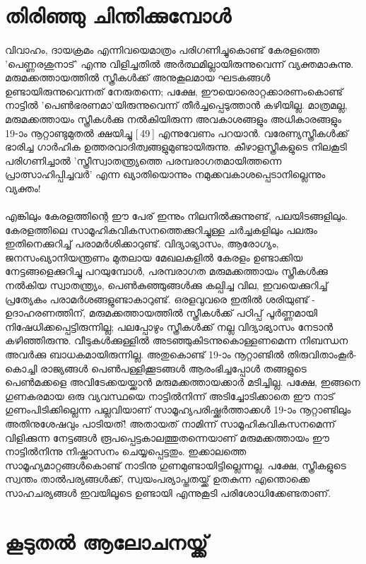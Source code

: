 \section{തിരിഞ്ഞു ചിന്തിക്കുമ്പോൾ}
\paragraph{}വിവാഹം, ദായക്രമം എന്നിവയെമാത്രം പരിഗണിച്ചുകൊണ്ട് കേരളത്തെ 'പെണ്ണരശുനാട്' എന്നു വിളിച്ചതിൽ അർത്ഥമില്ലായിരുന്നുവെന്ന് വ്യക്തമാകുന്നു. മരുമക്കത്തായത്തിൽ സ്ത്രീകൾക്ക് അനുകൂലമായ ഘടകങ്ങൾ ഉണ്ടായിരുന്നുവെന്നത് നേരുതന്നെ; പക്ഷേ, ഈയൊരൊറ്റക്കാരണംകൊണ്ട് നാട്ടിൽ 'പെൺഭരണമാ'യിരുന്നുവെന്ന് തീർച്ചപ്പെടുത്താൻ കഴിയില്ല. മാത്രമല്ല, മരുമക്കത്തായം സ്ത്രീകൾക്കു നൽകിയിരുന്ന അവകാശങ്ങളും അധികാരങ്ങളും 19-ാം നൂറ്റാണ്ടുമുതൽ ക്ഷയിച്ചു [ 49 ] എന്നുവേണം പറയാൻ. വരേണ്യസ്ത്രീകൾക്ക് ഭാരിച്ച ഗാർഹിക ഉത്തരവാദിത്വങ്ങളുമുണ്ടായിരുന്നു. കീഴാളസ്ത്രീകളുടെ നിലകൂടി പരിഗണിച്ചാൽ 'സ്ത്രീസ്വാതന്ത്ര്യത്തെ പരമ്പരാഗതമായിത്തന്നെ പ്രാത്സാഹിപ്പിച്ചവർ' എന്ന ഖ്യാതിയൊന്നും നമുക്കവകാശപ്പെടാനില്ലെന്നും വ്യക്തം!
\paragraph{}എങ്കിലും കേരളത്തിന്റെ ഈ പേര് ഇന്നും നിലനിൽക്കുന്നുണ്ട്, പലയിടങ്ങളിലും. കേരളത്തിലെ സാമൂഹികവികസനത്തെക്കുറിച്ചുള്ള ചർച്ചകളിലും പലരും ഇതിനെക്കുറിച്ച് പരാമർശിക്കാറുണ്ട്. വിദ്യാഭ്യാസം, ആരോഗ്യം, ജനസംഖ്യാനിയന്ത്രണം മുതലായ മേഖലകളിൽ കേരളം ഉണ്ടാക്കിയ നേട്ടങ്ങളെക്കുറിച്ചു പറയുമ്പോൾ, പരമ്പരാഗത മരുമക്കത്തായം സ്ത്രീകൾക്കു നൽകിയ സ്വാതന്ത്ര്യം, പെൺകുഞ്ഞുങ്ങൾക്കു കല്പിച്ച വില, ഇവയെക്കുറിച്ച് പ്രത്യേകം പരാമർശങ്ങളുണ്ടാകാറുണ്ട്. ഒരളവുവരെ ഇതിൽ ശരിയുണ്ട് - ഉദാഹരണത്തിന്, മരുമക്കത്തായത്തിൽ സ്ത്രീകൾക്ക് പഠിപ്പ് പൂർണ്ണമായി നിഷേധിക്കപ്പെട്ടിരുന്നില്ല; പലപ്പോഴും സ്ത്രീകൾക്ക് നല്ല വിദ്യാഭ്യാസം നേടാൻ കഴിഞ്ഞിരുന്നു. വീടുകൾക്കുള്ളിൽ അടഞ്ഞുകിടന്നുകൊള്ളണമെന്ന നിബന്ധന അവർക്കു ബാധകമായിരുന്നില്ല. അതുകൊണ്ട് 19-ാം നൂറ്റാണ്ടിൽ തിരുവിതാംകൂർ-കൊച്ചി രാജ്യങ്ങൾ പെൺപള്ളിക്കൂടങ്ങൾ ആരംഭിച്ചപ്പോൾ തങ്ങളുടെ പെൺമക്കളെ അവിടേക്കയയ്ക്കാൻ മരുമക്കത്തായക്കാർ മടിച്ചില്ല. പക്ഷേ, ഇങ്ങനെ ഗുണകരമായ ഒരു വ്യവസ്ഥയെ നാട്ടിൽനിന്ന് അടിച്ചോടിക്കാതെ ഈ നാട് ഗുണംപിടിക്കില്ലെന്ന പല്ലവിയാണ് സാമൂഹ്യപരിഷ്ക്കർത്താക്കൾ 19-ാം നൂറ്റാണ്ടിലും അതിനുശേഷവും പാടിയത്! അതായത് നാമിന്ന് സാമൂഹികവികസനമെന്ന് വിളിക്കുന്ന നേട്ടങ്ങൾ രൂപപ്പെട്ടകാലത്തുതന്നെയാണ് മരുമക്കത്തായം ഈ നാട്ടിൽനിന്നു നിഷ്ക്കാസനം ചെയ്യപ്പെട്ടതും. ഇക്കാലത്തെ സാമൂഹ്യമാറ്റങ്ങൾകൊണ്ട് നാടിനു ഗുണമുണ്ടായിട്ടില്ലെന്നല്ല. പക്ഷേ, സ്ത്രീകളുടെ സ്വന്തം താൽപര്യങ്ങൾക്ക്, സ്വയംപര്യാപ്തതയ്ക്ക് ഉതകുന്ന എന്തൊക്കെ സാഹചര്യങ്ങൾ ഇവയിലൂടെ ഉണ്ടായി എന്നുകൂടി പരിശോധിക്കേണ്ടതാണ്.
\section{കൂടുതല്‍ ആലോചനയ്ക്ക്}
